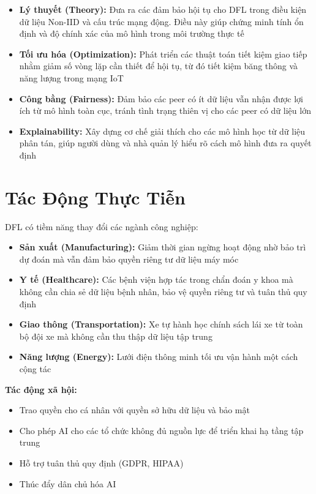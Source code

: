 \begin{itemize}
    \item \textbf{Lý thuyết (Theory):} Đưa ra các đảm bảo hội tụ cho DFL trong điều kiện dữ liệu Non-IID và cấu trúc mạng động. Điều này giúp chứng minh tính ổn định và độ chính xác của mô hình trong môi trường thực tế
    \item \textbf{Tối ưu hóa (Optimization):} Phát triển các thuật toán tiết kiệm giao tiếp nhằm giảm số vòng lặp cần thiết để hội tụ, từ đó tiết kiệm băng thông và năng lượng trong mạng IoT
    \item \textbf{Công bằng (Fairness):} Đảm bảo các peer có ít dữ liệu vẫn nhận được lợi ích từ mô hình toàn cục, tránh tình trạng thiên vị cho các peer có dữ liệu lớn
    \item \textbf{Explainability:} Xây dựng cơ chế giải thích cho các mô hình học từ dữ liệu phân tán, giúp người dùng và nhà quản lý hiểu rõ cách mô hình đưa ra quyết định
\end{itemize}

\section{Tác Động Thực Tiễn}

DFL có tiềm năng thay đổi các ngành công nghiệp:

\begin{itemize}
    \item \textbf{Sản xuất (Manufacturing):} Giảm thời gian ngừng hoạt động nhờ bảo trì dự đoán mà vẫn đảm bảo quyền riêng tư dữ liệu máy móc
    \item \textbf{Y tế (Healthcare):} Các bệnh viện hợp tác trong chẩn đoán y khoa mà không cần chia sẻ dữ liệu bệnh nhân, bảo vệ quyền riêng tư và tuân thủ quy định
    \item \textbf{Giao thông (Transportation):} Xe tự hành học chính sách lái xe từ toàn bộ đội xe mà không cần thu thập dữ liệu tập trung
    \item \textbf{Năng lượng (Energy):} Lưới điện thông minh tối ưu vận hành một cách cộng tác
\end{itemize}

\textbf{Tác động xã hội:}
\begin{itemize}
    \item Trao quyền cho cá nhân với quyền sở hữu dữ liệu và bảo mật
    \item Cho phép AI cho các tổ chức không đủ nguồn lực để triển khai hạ tầng tập trung
    \item Hỗ trợ tuân thủ quy định (GDPR, HIPAA)
    \item Thúc đẩy dân chủ hóa AI
\end{itemize}
